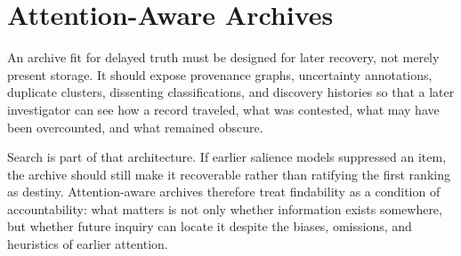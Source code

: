 
\chapter{Attention-Aware Archives}
\label{ch:ch100}

An archive fit for delayed truth must be designed for later recovery, not merely present storage. It should expose provenance graphs, uncertainty annotations, duplicate clusters, dissenting classifications, and discovery histories so that a later investigator can see how a record traveled, what was contested, what may have been overcounted, and what remained obscure.

Search is part of that architecture. If earlier salience models suppressed an item, the archive should still make it recoverable rather than ratifying the first ranking as destiny. Attention-aware archives therefore treat findability as a condition of accountability: what matters is not only whether information exists somewhere, but whether future inquiry can locate it despite the biases, omissions, and heuristics of earlier attention.
